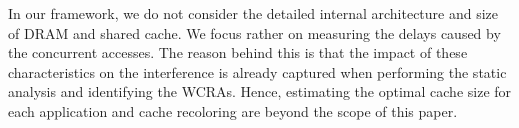 In our framework, we do not consider the detailed internal architecture and size of DRAM and shared cache. We focus rather on measuring the delays caused by the concurrent accesses. The reason behind this is that the impact of these characteristics on the
interference is already captured when performing the static analysis and identifying the WCRAs. Hence, estimating the optimal cache size for each application and cache recoloring are beyond the scope of this paper.
